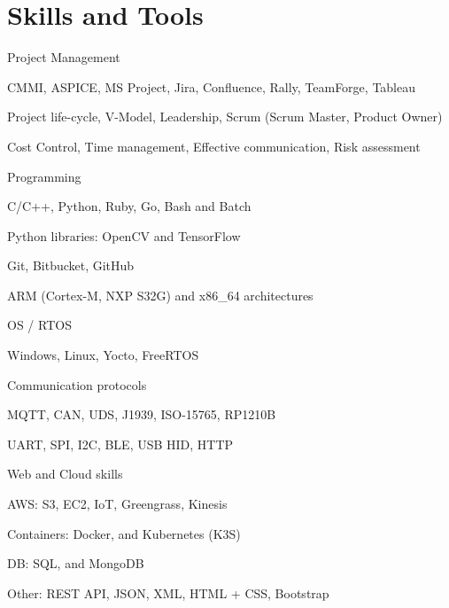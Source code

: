 \documentclass{resume} %
\begin{document}
\section{Skills and Tools}


\skillgroup
    {Project Management}
    {
    \begin{itemize-bullets}
        \item{CMMI, ASPICE, MS Project, Jira, Confluence, Rally, TeamForge, Tableau}
        \item{Project life-cycle, V-Model, Leadership, Scrum (Scrum Master, Product Owner)}
        \item{Cost Control, Time management, Effective communication, Risk assessment}
        \end{itemize-bullets}
    }


\skillgroup
    {Programming}
    {
    \begin{itemize-bullets}
        \item{C/C++, Python, Ruby, Go, Bash and Batch}
        \item{Python libraries: OpenCV and TensorFlow}
        \item{Git, Bitbucket, GitHub}
        \item{ARM (Cortex-M, NXP S32G) and x86_64 architectures}
        \end{itemize-bullets}
    }


\skillgroup
    {OS / RTOS}
    {
    \begin{itemize-bullets}
        \item{Windows, Linux, Yocto, FreeRTOS}
        \end{itemize-bullets}
    }


\skillgroup
    {Communication protocols}
    {
    \begin{itemize-bullets}
        \item{MQTT, CAN, UDS, J1939, ISO-15765, RP1210B}
        \item{UART, SPI, I2C, BLE, USB HID, HTTP}
        \end{itemize-bullets}
    }


\skillgroup
    {Web and Cloud skills}
    {
    \begin{itemize-bullets}
        \item{AWS: S3, EC2, IoT, Greengrass, Kinesis}
        \item{Containers: Docker, and Kubernetes (K3S)}
        \item{DB: SQL, and MongoDB}
        \item{Other: REST API, JSON, XML, HTML + CSS, Bootstrap}
        \end{itemize-bullets}
    }
\end{document}
